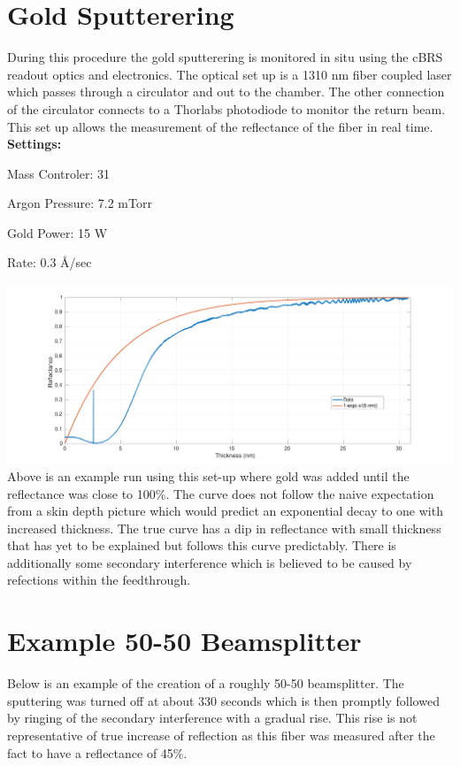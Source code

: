 \documentclass{article}
\begin{document}
\section{Gold Sputterering}
During this procedure the gold sputterering is monitored in situ using the cBRS readout optics and electronics. The optical set up is a 1310 nm fiber coupled laser which passes through a circulator and out to the chamber. The other connection of the circulator connects to a Thorlabs photodiode to monitor the return beam. This set up allows the measurement of the reflectance of the fiber in real time.\\

\textbf{Settings:}

Mass Controler: 31

Argon Pressure: 7.2 mTorr

Gold Power: 15 W

Rate: 0.3 \AA/sec

\includegraphics[width=\textwidth]{Gold_Coating_Fiber.pdf}
Above is an example run using this set-up where gold was added until the reflectance was close to 100\%. The curve does not follow the naive expectation from a skin depth picture which would predict an exponential decay to one with increased thickness. The true curve has a dip in reflectance with small thickness that has yet to be explained but follows this curve predictably. There is additionally some secondary interference which is believed to be caused by refections within the feedthrough.

\section{Example 50-50 Beamsplitter}
Below is an example of the creation of a roughly 50-50 beamsplitter. The sputtering was turned off at about 330 seconds which is then promptly followed by ringing of the secondary interference with a gradual rise. This rise is not representative of true increase of reflection as this fiber was measured after the fact to have a reflectance of 45\%.
\end{document}

